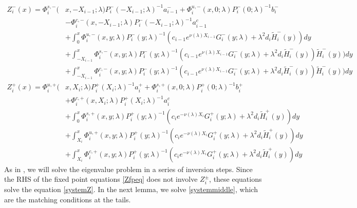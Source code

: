 \documentclass[10pt,reqno]{amsart}
\theoremstyle{plain}
\theoremstyle{definition}
\theoremstyle{remark}
\numberwithin{theorem}{section}
\numberwithin{equation}{section}
\begin{document}
\begin{equation}\label{Zfpeq}
\begin{aligned}
Z_i^-(x) = \Phi_i^{s,-}(&x, -X_{i-1}; \lambda) P_i^-(-X_{i-1}; \lambda)^{-1} a_{i-1}^- + \Phi_i^{u,-}(x, 0; \lambda) P_i^-(0; \lambda)^{-1} b_i^- \\
&- \Phi_i^{c,-}(x, -X_{i-1}; \lambda) P_i^-(-X_{i-1}; \lambda)^{-1} a_{i-1}^c \\
&+ \int_0^x \Phi_i^{u,-}(x, y; \lambda)P_i^-(y; \lambda)^{-1}(c_{i-1} e^{\nu(\lambda)X_{i-1}} G_i^-(y; \lambda) + \lambda^2 d_i \tilde{H}_i^-(y)) dy \\
&+ \int_{-X_{i-1}}^x \Phi_i^{s,-}(x, y; \lambda) P_i^-(y; \lambda)^{-1} (c_{i-1} e^{\nu(\lambda)X_{i-1}} G_i^-(y; \lambda) + \lambda^2 d_i \tilde{H}_i^-(y)) \tilde{H}_i^-(y)) dy \\
&+ \int_{-X_{i-1}}^x \Phi_i^{c,-}(x, y; \lambda) P_i^-(y; \lambda)^{-1} (c_{i-1} e^{\nu(\lambda)X_{i-1}} G_i^-(y; \lambda) + \lambda^2 d_i \tilde{H}_i^-(y)) \tilde{H}_i^-(y)) dy  \\ 
Z_i^+(x) = \Phi_i^{u,+}(&x, X_i; \lambda) P_i^+(X_i; \lambda)^{-1} a_i^+ + \Phi_i^{s,+}(x, 0; \lambda) P_i^+(0; \lambda)^{-1} b_i^+ \\
&+ \Phi_i^{c,+}(x, X_i; \lambda) P_i^+(X_i; \lambda)^{-1} a_i^c \\
&+ \int_0^x \Phi_i^{s,+}(x, y; \lambda) P_i^+(y; \lambda)^{-1} (c_i e^{-\nu(\lambda)X_i} G_i^+(y; \lambda) + \lambda^2 d_i \tilde{H}_i^+(y)) dy \\
&+ \int_{X_i}^x \Phi_i^{u,+}(x, y; \lambda) P_i^+(y; \lambda)^{-1}( c_i e^{-\nu(\lambda)X_i} G_i^+(y; \lambda) + \lambda^2 d_i \tilde{H}_i^+(y)) dy \\
&+ \int_{X_i}^x \Phi_i^{c,+}(x, y; \lambda) P_i^+(y; \lambda)^{-1}( c_i e^{-\nu(\lambda)X_i} G_i^+(y; \lambda) + \lambda^2 d_i \tilde{H}_i^+(y)) dy 
\end{aligned}
\end{equation}
As in \cite{Sandstede1998}, we will solve the eigenvalue problem in a series of inversion steps. Since the RHS of the fixed point equations \cref{Zfpeq} does not involve $Z_i^\pm$, these equations solve the equation \cref{systemZ}. In the next lemma, we solve \cref{systemmiddle}, which are the matching conditions at the tails.
\end{document}

